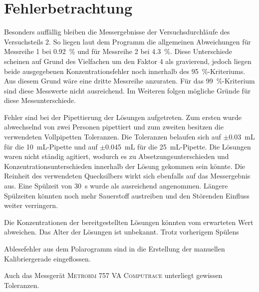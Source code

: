 \section{Fehlerbetrachtung}
\label{sec:fehler}


Besonders auffällig bleiben die Messergebnisse der Versuchsdurchläufe des Versuchsteils 2. So liegen laut dem Programm die allgemeinen Abweichungen für Messreihe 1 bei \SI{0,92}{\percent} und für Messreihe 2 bei \SI{4,3}{\percent}. Diese Unterschiede scheinen auf Grund des Vielfachen um den Faktor 4 als gravierend, jedoch liegen beide ausgegebenen Konzentrationsfehler noch innerhalb des \SI{95}{\percent}-Kriteriums. Aus diesem Grund wäre eine dritte Messreihe anzuraten. Für das \SI{99}{\percent}-Kriterium sind diese Messwerte nicht ausreichend. Im Weiteren folgen mögliche Gründe für diese Messunterschiede.

Fehler sind bei der Pipettierung der Lösungen aufgetreten. Zum ersten wurde abwechselnd von zwei Personen pipettiert und zum zweiten besitzen die verwendeten Vollpipetten Toleranzen. Die Toleranzen belaufen sich auf $\pm$\SI{0,03}{\milli\liter} für die \SI{10}{\milli\liter}-Pipette und auf $\pm$\SI{0,045}{\milli\liter} für die \SI{25}{\milli\liter}-Pipette. Die Lösungen waren nicht ständig agitiert, wodurch es zu Absetzungsunterschieden und Konzentrationsunterschieden innerhalb der Lösung gekommen sein könnte. Die Reinheit des verwendeten Quecksilbers wirkt sich ebenfalls auf das Messergebnis aus. Eine Spülzeit von \SI{30}{\second} wurde als ausreichend angenommen. Längere Spülzeiten könnten noch mehr Sauerstoff austreiben und den Störenden Einfluss weiter verringern.

Die Konzentrationen der bereitgestellten Lösungen könnten vom erwarteten Wert abweichen. Das Alter der Lösungen ist unbekannt. Trotz vorherigem Spülens

Ablesefehler aus dem Polarogramm sind in die Erstellung der manuellen Kalibriergerade eingeflossen.


Auch das Messgerät \textsc{Metrohm 757 VA Computrace} unterliegt gewissen Toleranzen.